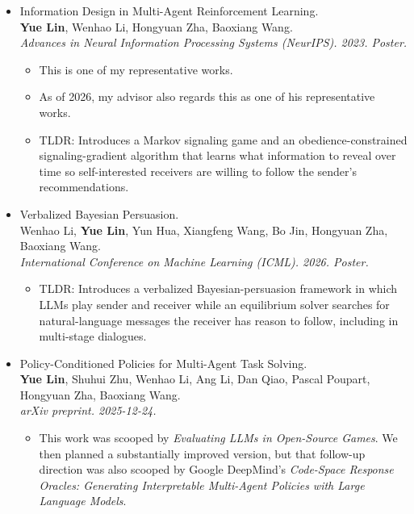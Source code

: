 \documentclass[a4paper,20pt]{article}
\begin{document}
\begin{itemize}[leftmargin=*,itemsep=0pt,topsep=0pt,partopsep=0pt]

\item Information Design in Multi-Agent Reinforcement Learning. \\
      \textbf{Yue Lin}, Wenhao Li, Hongyuan Zha, Baoxiang Wang. \\
      \textit{Advances in Neural Information Processing Systems (NeurIPS). 2023. Poster.}
      \begin{itemize}[itemsep=0pt,topsep=0pt,partopsep=0pt]
        \item This is one of my representative works.
        \item As of 2026, my advisor also regards this as one of his representative works.

        \item TLDR: Introduces a Markov signaling game and an obedience-constrained signaling-gradient algorithm that learns what information to reveal over time so self-interested receivers are willing to follow the sender's recommendations.
      \end{itemize}
\item Verbalized Bayesian Persuasion. \\
      Wenhao Li, \textbf{Yue Lin}, Yun Hua, Xiangfeng Wang, Bo Jin, Hongyuan Zha, Baoxiang Wang. \\
      \textit{International Conference on Machine Learning (ICML). 2026. Poster.}
      \begin{itemize}[itemsep=0pt,topsep=0pt,partopsep=0pt]

        \item TLDR: Introduces a verbalized Bayesian-persuasion framework in which LLMs play sender and receiver while an equilibrium solver searches for natural-language messages the receiver has reason to follow, including in multi-stage dialogues.
      \end{itemize}
\item Policy-Conditioned Policies for Multi-Agent Task Solving. \\
      \textbf{Yue Lin}, Shuhui Zhu, Wenhao Li, Ang Li, Dan Qiao, Pascal Poupart, Hongyuan Zha, Baoxiang Wang. \\
      \textit{arXiv preprint. 2025-12-24.}
      \begin{itemize}[itemsep=0pt,topsep=0pt,partopsep=0pt]
        \item This work was scooped by
              \textit{Evaluating LLMs in Open-Source Games}.
              We then planned a substantially improved version, but that follow-up direction was also
              scooped by Google DeepMind's
              \textit{Code-Space Response Oracles: Generating Interpretable Multi-Agent Policies with Large Language Models}.


\end{itemize}
\end{itemize}
\end{document}
